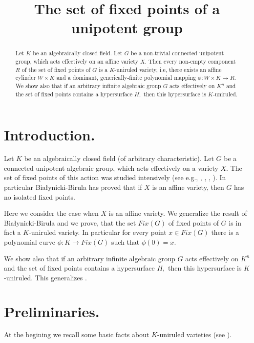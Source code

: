 \documentclass{amsproc}
\begin{document}
\title[The set of fixed points]{The set of fixed points of a unipotent group}

\begin{abstract}
Let $K$ be an algebraically closed field. Let $G$ be a non-trivial
connected unipotent group, which acts effectively on an affine
variety $X.$ Then every non-empty component $R$ of the set of
fixed points of $G$ is a $K$-uniruled variety, i.e, there exists
an affine cylinder $W\times K$ and a dominant, generically-finite
polynomial mapping $\phi : W\times K\rightarrow R.$ We show also
that if an arbitrary infinite algebraic group $G$ acts effectively
on $K^n$ and the set of fixed points contains a hypersurface $H,$
then this hypersurface is $K$-uniruled.
\end{abstract}

\maketitle

\section{Introduction.}
Let $K$ be an algebraically closed field (of arbitrary characteristic). Let $G$ be a connected unipotent
algebraic group, which acts effectively on a variety $X.$ The set
of fixed points of this action was studied intensively (see e.g.,
\cite{b-b},  \cite{car}, \cite{gross}, \cite{hor}). In particular
Bia\l ynicki-Birula has proved that if $X$ is an affine variety,
then $G$ has no isolated fixed points.

Here we consider the case when $X$ is an affine variety. We
generalize the result of Bia\l ynicki-Birula and we prove, that
the set $Fix(G)$ of fixed points of $G$ is in fact a $K$-uniruled
variety. In particular for every  point $x\in Fix(G)$ there is a
polynomial curve $\phi : K\to Fix(G)$ such that $\phi(0)=x.$

We show also that if an arbitrary infinite algebraic group $G$
acts effectively on $K^n$ and the set of fixed points contains a
hypersurface $H,$ then this hypersurface is $K$-uniruled. This
generalizes \cite{jel}.

\section{ Preliminaries.}
At the begining  we recall some basic facts about $K$-uniruled
varieties (see \cite{jel?}).
\end{document}
